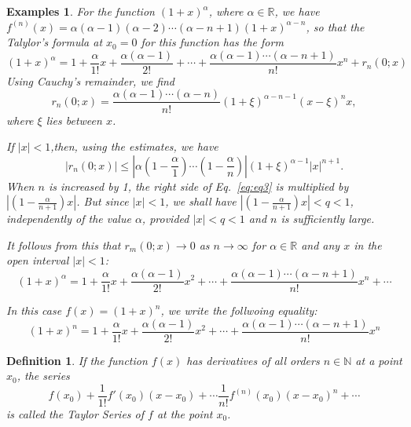 \documentclass[a4paper,12pt]{article} %
\newtheorem{definition}{Definition}[section]
\newtheorem{example}{Examples}
\begin{document}
\begin{example}
    \normalfont
    For the function $(1+x)^{\alpha}$, where $\alpha \in \mathbb{R}$, we have 
    $\displaystyle f^{(n)}(x) = \alpha(\alpha - 1)(\alpha - 2)\cdots(\alpha - n + 1)(1+x)^{\alpha - n} $,
    so that the Talylor's formula at $x_0 = 0$ for this function has the 
    form 
    \begin{equation}
        (1+x)^{\alpha} = 1 + \frac{\alpha}{1!}x + \frac{\alpha(\alpha - 1)}{2!} 
        + \cdots + \frac{\alpha(\alpha-1)\cdots(\alpha-n+1)}{n!}x^n + r_n(0;x)
    \end{equation}
    Using Cauchy's remainder, we find 
    \[
        r_n(0;x) = \frac{\alpha(\alpha-1)\cdots(\alpha-n)}{n!}(1+\xi)^{\alpha - n -1}
        (x - \xi)^nx,
        \]
    where $\xi$ lies between $x$.

    If $\vert x \vert < 1$,then, using the estimates, we have
    \begin{equation}
        \vert r_n(0;x) \vert \le \left\vert \alpha \left(1-\frac{\alpha}{1}\right)
        \cdots \left(1-\frac{\alpha}{n}\right)\right\vert \left(1+\xi\right)^{\alpha-1} 
        \vert x \vert^{n+1}.
        \label{eq:eq3}
    \end{equation}
    When $n$ is increased by 1, the right side of Eq.~\ref{eq:eq3}
    is multiplied by $\displaystyle \left\vert \left(1 - \frac{\alpha}{n+1}\right)
    x\right\vert$. But since $\vert x \vert < 1$, we shall have 
    $\left\vert\left(1 - \frac{\alpha}{n+1}\right)x\right\vert < q < 1$,
    independently of the value $\alpha$, provided $\vert x \vert < q < 1$
    and $n$ is sufficiently large.

    It follows from this that $r_m(0;x) \to 0$ as $n \to \infty$
    for $\alpha \in \mathbb{R}$ and any $x$ in the open interval
    $\vert x \vert < 1$:
    \begin{equation}
        (1+x)^{\alpha} = 1 + \frac{\alpha}{1!}x + \frac{\alpha(\alpha - 1)}{2!}x^2 
        + \cdots + \frac{\alpha(\alpha-1)\cdots(\alpha-n+1)}{n!}x^n + \cdots
    \end{equation}

    In this case $f(x) = (1+x)^n$, we write the follwoing equality:
    \[
        (1+x)^{n} = 1 + \frac{\alpha}{1!}x + \frac{\alpha(\alpha - 1)}{2!}x^2 
        + \cdots + \frac{\alpha(\alpha-1)\cdots(\alpha-n+1)}{n!}x^n
        \]
\end{example}

\begin{definition}
    \normalfont
    If the function $f(x)$ has derivatives of all orders $n \in \mathbb{N}$
    at a point $x_0$, the series 
    \[
        f(x_0) + \frac{1}{1!}f'(x_0)(x - x_0) + \cdots 
        \frac{1}{n!}f^{(n)} (x_0)(x - x_0)^n + \cdots
        \]
    is called the Taylor Series of $f$ at the point $x_0$.
\end{definition}
\end{document}
